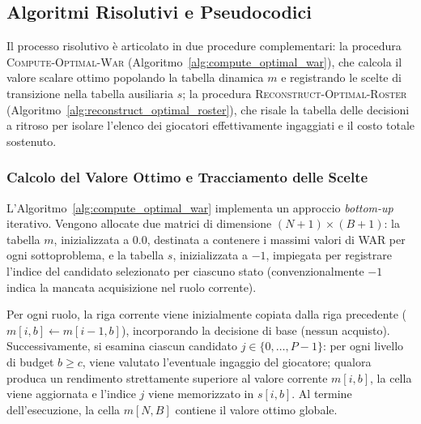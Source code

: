 \subsection{Algoritmi Risolutivi e Pseudocodici}
Il processo risolutivo è articolato in due procedure complementari:
la procedura \textsc{Compute-Optimal-War} (Algoritmo~\ref{alg:compute_optimal_war}), che calcola il valore scalare ottimo popolando la tabella dinamica $m$ e registrando le scelte di transizione nella tabella ausiliaria $s$;
la procedura \textsc{Reconstruct-Optimal-Roster} (Algoritmo~\ref{alg:reconstruct_optimal_roster}), che risale la tabella delle decisioni a ritroso per isolare l'elenco dei giocatori effettivamente ingaggiati e il costo totale sostenuto.

\subsubsection{Calcolo del Valore Ottimo e Tracciamento delle Scelte}
L'Algoritmo~\ref{alg:compute_optimal_war} implementa un approccio \textit{bottom-up} iterativo. Vengono allocate due matrici di dimensione $(N + 1) \times (B + 1)$: la tabella $m$, inizializzata a $0.0$, destinata a contenere i massimi valori di WAR per ogni sottoproblema, e la tabella $s$, inizializzata a $-1$, impiegata per registrare l'indice del candidato selezionato per ciascuno stato (convenzionalmente $-1$ indica la mancata acquisizione nel ruolo corrente).

Per ogni ruolo, la riga corrente viene inizialmente copiata dalla riga precedente ($m[i, b] \gets m[i-1, b]$), incorporando la decisione di base (nessun acquisto). Successivamente, si esamina ciascun candidato $j \in \{0, \dots, P - 1\}$: per ogni livello di budget $b \ge c$, viene valutato l'eventuale ingaggio del giocatore; qualora produca un rendimento strettamente superiore al valore corrente $m[i, b]$, la cella viene aggiornata e l'indice $j$ viene memorizzato in $s[i, b]$. Al termine dell'esecuzione, la cella $m[N, B]$ contiene il valore ottimo globale.


